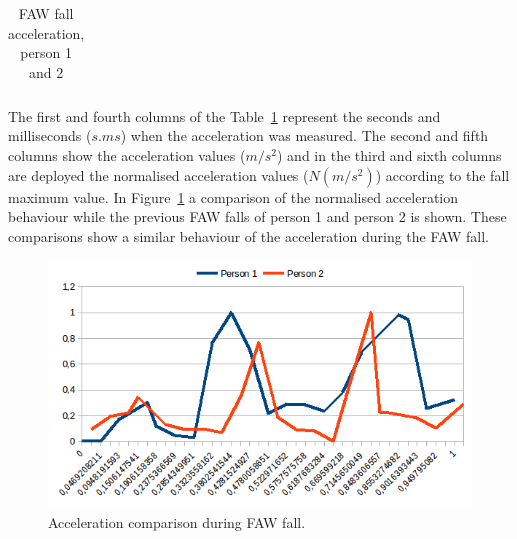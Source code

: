 \documentclass[conference]{IEEEtran}
\theoremstyle{definition}
\begin{document}
\begin{table}[!h]
 \centering
 \begin{tabular}{*{5}{r}}
   
 \end{tabular}
 \caption{FAW fall acceleration, person 1 and 2}%
 \label{tabla:FAW}
\end{table}

The first and fourth columns of the Table~\ref{tabla:FAW} represent the seconds and milliseconds ($s.ms$) when the acceleration 
was measured. The second and fifth columns show the acceleration values ($m/s^2$) and in the third and sixth columns are deployed 
the normalised acceleration values ($N(m/s^2)$) according to the fall maximum value. In Figure~\ref{fig:FAWcomparison} a comparison 
of the normalised acceleration behaviour while the previous FAW falls of person 1 and person 2 is shown. These comparisons show a 
similar behaviour of the acceleration during the FAW fall.

\begin{figure}[!h]
  \centering
  \includegraphics[scale=0.35]{img/FAWComparison.png}
  \caption[Acceleration during FAW fall]{Acceleration comparison during FAW fall.}
  \label{fig:FAWcomparison}
\end{figure}
\end{document}
